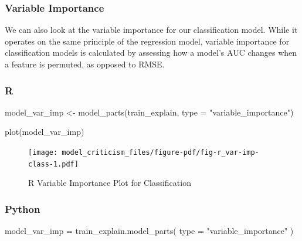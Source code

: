 \documentclass[
  letterpaper,
]{krantz}
\newenvironment{Shaded}{}{}
\newcommand{\AttributeTok}[1]{\textcolor[rgb]{0.49,0.56,0.16}{#1}}
\newcommand{\BuiltInTok}[1]{\textcolor[rgb]{0.00,0.50,0.00}{#1}}
\newcommand{\FunctionTok}[1]{\textcolor[rgb]{0.02,0.16,0.49}{#1}}
\newcommand{\NormalTok}[1]{#1}
\newcommand{\OperatorTok}[1]{\textcolor[rgb]{0.40,0.40,0.40}{#1}}
\newcommand{\OtherTok}[1]{\textcolor[rgb]{0.00,0.44,0.13}{#1}}
\newcommand{\StringTok}[1]{\textcolor[rgb]{0.25,0.44,0.63}{#1}}
\begin{document}
\subsubsection{Variable Importance}\label{variable-importance-1}

We can also look at the variable importance for our classification
model. While it operates on the same principle of the regression model,
variable importance for classification models is calculated by assessing
how a model's AUC changes when a feature is permuted, as opposed to
RMSE.

\subsubsection{R}

\begin{Shaded}
\begin{Highlighting}[]
\NormalTok{model\_var\_imp }\OtherTok{\textless{}{-}} \FunctionTok{model\_parts}\NormalTok{(train\_explain, }
                             \AttributeTok{type =} \StringTok{"variable\_importance"}\NormalTok{)}
\end{Highlighting}
\end{Shaded}

\begin{Shaded}
\begin{Highlighting}[]
\FunctionTok{plot}\NormalTok{(model\_var\_imp)}
\end{Highlighting}
\end{Shaded}

\begin{figure}[H]

{\centering \texttt{[image: model\_criticism\_files/figure-pdf/fig-r\_var-imp-class-1.pdf]}

}

\caption{\label{fig-r_var-imp-class}R Variable Importance Plot for
Classification}

\end{figure}

\subsubsection{Python}

\begin{Shaded}
\begin{Highlighting}[]
\NormalTok{model\_var\_imp }\OperatorTok{=}\NormalTok{ train\_explain.model\_parts(}
  \BuiltInTok{type} \OperatorTok{=} \StringTok{"variable\_importance"}
\NormalTok{  )}
\end{Highlighting}
\end{Shaded}
\end{document}
